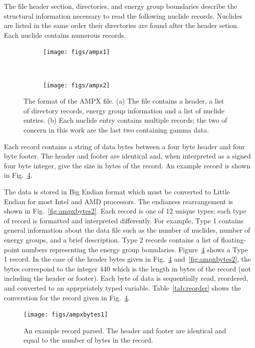 The file header section, directories, and energy group boundaries describe the structural information necessary to read the following nuclide records. Nuclides are listed in the same order their directories are found after the header setion. Each nuclide contains numerous records.

\begin{figure}
    \centering
    \begin{subfigure}[b]{0.45\textwidth}
        \texttt{[image: figs/ampx1]}
        \caption{}
        \label{fig:ampx1}
    \end{subfigure}
    ~
    \begin{subfigure}[b]{0.45\textwidth}
        \texttt{[image: figs/ampx2]}
        \caption{}
        \label{fig:ampx2}
    \end{subfigure}
    \caption{The format of the AMPX file. (a) The file contains a header, a list of directory records, energy group information and a list of nuclide entries. (b) Each nuclide entry contains multiple records; the two of concern in this work are the last two containing gamma data.}\label{fig:ampx}
\end{figure}

Each record contains a string of data bytes between a four byte header and four byte footer. The header and footer are identical and, when interpreted as a signed four byte integer, give the size in bytes of the record. An example record is shown in Fig.~\ref{fig:ampxbytes1}.

The data is stored in Big Endian format which must be converted to Little Endian for most Intel and AMD processors.  The endianess rearrangement is shown in Fig.~\ref{fig:ampxbytes2}. Each record is one of 12 unique types; each type of record is formatted and interpreted differently. For example, Type 1 contains general information about the data file such as the number of nuclides, number of energy groups, and a brief description. Type 2 records contains a list of floating-point numbers representing the energy group boundaries. Figure~\ref{fig:ampxbytes1} shows a Type 1 record. In the case of the header bytes given in Fig.~\ref{fig:ampxbytes1} and~\ref{fig:ampxbytes2}, the bytes correspond to the integer 440 which is the length in bytes of the record (not including the header or footer). Each byte of data is sequentially read, reordered, and converted to an apprpriately typed variable. Table~\ref{tab:reorder} shows the converstion for the record given in Fig.~\ref{fig:ampxbytes1}.

\begin{figure}[tb]
  \begin{center}
   \texttt{[image: figs/ampxbytes1]}
  \end{center}
  \caption{An example record parsed. The header and footer are identical and equal to the number of bytes in the record.}
\label{fig:ampxbytes1}
\end{figure}

